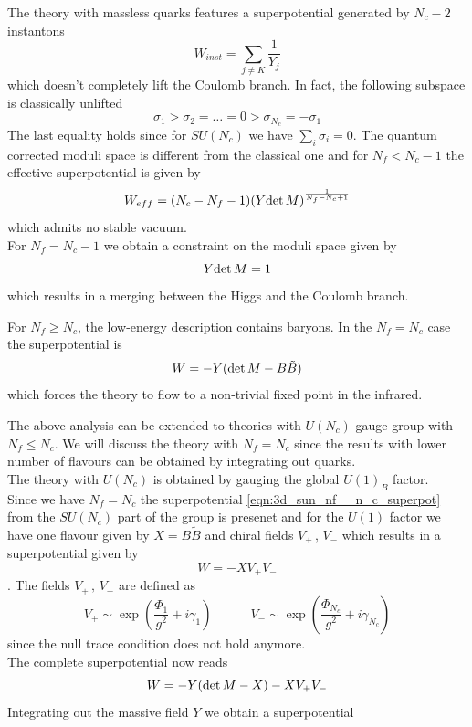 The theory with massless quarks features a superpotential generated by $N_c - 2$ instantons 
\begin{equation}
W_{inst} = \sum_{j \neq K} \frac{1}{Y_j}
\end{equation}
which doesn't completely lift the Coulomb branch.
In fact, the following subspace is classically unlifted
\begin{equation}
 \sigma_1 > \sigma_2 = \dots = 0 > \sigma_{N_c} = - \sigma_1
\end{equation}
The last equality holds since for $SU(N_c)$ we have $\sum_i \sigma_i = 0$.
The quantum corrected moduli space is different from the classical one and for $N_f < N_c -1 $ the effective superpotential is given by
\begin{equation}
 W_{eff} = (N_c - N_f - 1) ( Y \mathrm{det } \,{M} ) ^{\frac{1}{N_f - N_c +1}}
\end{equation}
which admits no stable vacuum.\\
For $N_f = N_c - 1 $ we obtain a constraint on the moduli space given by 
\begin{equation}
Y \mathrm{det } \, M = 1
\end{equation}
which results in a merging between the Higgs and the Coulomb branch.

For $N_f \geq N_c $, the low-energy description contains baryons.
In the $N_f = N_c$ case the superpotential is 
\begin{equation}
W = - Y ( \mathrm{det } \,{M} - B \tilde{B})
\label{eqn:3d_sun_nf__n_c_superpot}
\end{equation}
which forces the theory to flow to a non-trivial fixed point in the infrared.

The above analysis can be extended to theories with $U(N_c)$ gauge group with $N_f \leq N_c$.
We will discuss the theory with $N_f = N_c$ since the results with lower number of flavours can be obtained by integrating out quarks.\\
The theory with $U(N_c)$ is obtained by gauging the global $U(1)_B$ factor.\\
Since we have $N_f=N_c$ the superpotential \eqref{eqn:3d_sun_nf__n_c_superpot} from the $SU(N_c)$ part of the group is presenet  and for the $U(1)$ factor we have one flavour given by $X = B \tilde{B}$ 
and chiral fields $V_+ \, , \,V_-$ which results in a superpotential given by
 $$ W = - X V_+ V_-$$.
The fields $V_+ \, , \, V_-$ are defined as 
\begin{equation}
V_+ \sim \exp{ \left(  \frac{\Phi_1}{g^2} + i \gamma_1 \right) } \qquad \quad V_- \sim \exp{ \left( \frac{\Phi_{N_c}}{g^2} + i \gamma_{N_c} \right) }
\end{equation}
since the null trace condition does not hold anymore.\\
The complete superpotential now reads
\begin{equation}
 W = - Y ( \mathrm{det } \,{M}  - X) - X V_+ V_- 
 \end{equation} 
Integrating out the massive field $Y$  we obtain a superpotential

